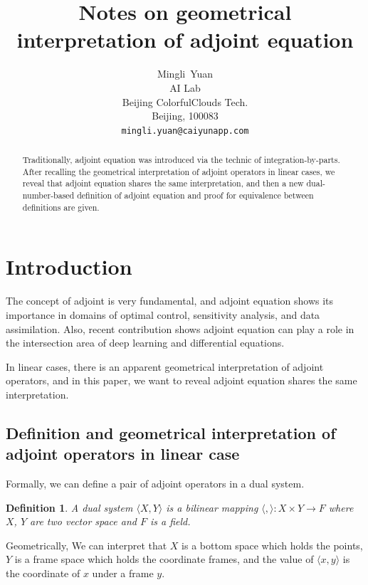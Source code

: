 \documentclass{article}
\title{Notes on geometrical interpretation of adjoint equation}
\author{
  Mingli~Yuan \\
  AI Lab \\
  Beijing ColorfulClouds Tech.\\
  Beijing, 100083 \\
  \texttt{mingli.yuan@caiyunapp.com} \\
}
\newtheorem{definition}{Definition}
\begin{document}
\maketitle

\begin{abstract}
Traditionally, adjoint equation was introduced via the technic of integration-by-parts.
After recalling the geometrical interpretation of adjoint operators in linear cases,
we reveal that adjoint equation shares the same interpretation,
and then a new dual-number-based definition of adjoint equation and proof for equivalence between definitions are given.
\end{abstract}


\section{Introduction}

The concept of adjoint is very fundamental\cite{Daz1953MethodsOM}\cite{Marchuk1995}, and adjoint equation shows its importance in domains of optimal control\cite{Liberzon2012CalculusOV}, sensitivity analysis\cite{hall1983physical}, and data assimilation\cite{Errico1997WhatIA}. Also, recent contribution\cite{Chen2018NeuralOD} shows adjoint equation can play a role in the intersection area of deep learning and differential equations.

In linear cases, there is an apparent geometrical interpretation of adjoint operators, and in this paper, we want to reveal adjoint equation shares the same interpretation.

\subsection{Definition and geometrical interpretation of adjoint operators in linear case}

Formally, we can define a pair of adjoint operators in a dual system.

\begin{definition}
\label{d0}
A dual system $ \langle X, Y \rangle $ is a bilinear mapping $ \langle , \rangle : X \times Y \to F $ where $X$, $Y$ are two vector space and $ F $ is a field.
\end{definition}

Geometrically, We can interpret that $ X $ is a bottom space which holds the points, $ Y $ is a frame space which holds the coordinate frames, and the value of $ \langle x, y \rangle $ is the coordinate of $x$ under a frame $y$.
\end{document}
